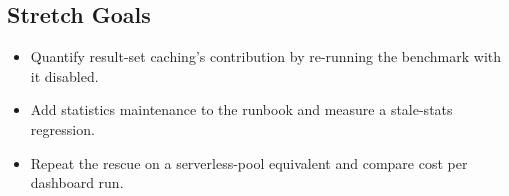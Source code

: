 \subsection*{Stretch Goals}
\begin{itemize}
    \item Quantify result-set caching's contribution by re-running the benchmark with it disabled.
    \item Add statistics maintenance to the runbook and measure a stale-stats regression.
    \item Repeat the rescue on a serverless-pool equivalent and compare cost per dashboard run.
\end{itemize}
